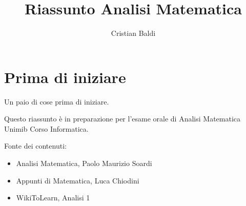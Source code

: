 \documentclass[a4paper,12pt,oneside]{book}
\title{Riassunto Analisi Matematica}
\author{Cristian Baldi}
\begin{document}
\maketitle

\tableofcontents

\chapter{Prima di iniziare}

Un paio di cose prima di iniziare.

Questo riassunto è in preparazione per l'esame orale di Analisi Matematica Unimib Corso Informatica.

Fonte dei contenuti:
\begin{itemize}
\item Analisi Matematica, Paolo Maurizio Soardi
\item Appunti di Matematica, Luca Chiodini
\item WikiToLearn, Analisi 1
\end{itemize}







\end{document}
